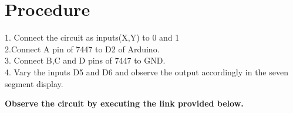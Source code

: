 \documentclass[journal,12pt,twocolumn]{IEEEtran}
\begin{document}
\section{Procedure}

1. Connect the circuit as inputs(X,Y) to 0 and 1\\
2.Connect A pin of 7447 to D2 of Arduino.\\
3. Connect B,C and D pins of 7447 to GND.\\
4. Vary the inputs D5 and D6 and observe the output 
accordingly in the seven segment display.

\textbf{Observe the circuit by executing the link provided below.}\\
\begin{center}
\end{center}
\end{document}
